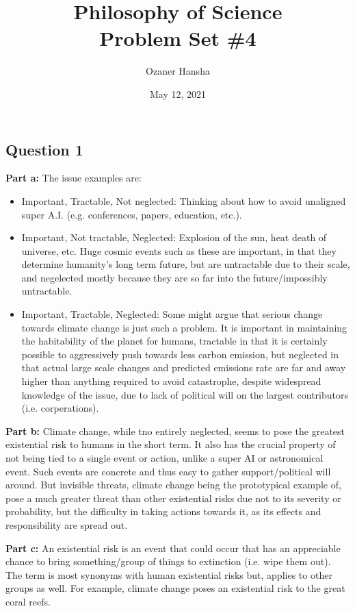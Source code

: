 \documentclass{article}
\begin{document}
\title{Philosophy of Science\\ Problem Set \#4}
\author{Ozaner Hansha}
\date{May 12, 2021}
\maketitle

\subsection*{Question 1}
\noindent\textbf{Part a:} The issue examples are:
\begin{itemize}
    \item Important, Tractable, Not neglected: Thinking about how to avoid unaligned super A.I. (e.g. conferences, papers, education, etc.).
    \item Important, Not tractable, Neglected: Explosion of the sun, heat death of universe, etc. Huge cosmic events such as these are important, in that they determine humanity's long term future, but are untractable due to their scale, and negelected mostly because they are so far into the future/impossibly untractable.
    \item Important, Tractable, Neglected: Some might argue that serious change towards climate change is just such a problem. It is important in maintaining the habitability of the planet for humans, tractable in that it is certainly possible to aggressively push towards less carbon emission, but neglected in that actual large scale changes and predicted emissions rate are far and away higher than anything required to avoid catastrophe, despite widespread knowledge of the issue, due to lack of political will on the largest contributors (i.e. corperations).
\end{itemize}
\bigskip

\noindent\textbf{Part b:} Climate change, while tno entirely neglected, seems to pose the greatest existential risk to humans in the short term. It also has the crucial property of not being tied to a single event or action, unlike a super AI or astronomical event. Such events are concrete and thus easy to gather support/political will around. But invisible threats, climate change being the prototypical example of, pose a much greater threat than other existential risks due not to its severity or probability, but the difficulty in taking actions towards it, as its effects and responsibility are spread out.
\bigskip

\noindent\textbf{Part c:} An existential risk is an event that could occur that has an appreciable chance to bring something/group of things to extinction (i.e. wipe them out). The term is most synonyms with human existential risks but, applies to other groups as well. For example, climate change poses an existential risk to the great coral reefs.
\bigskip
\end{document}
